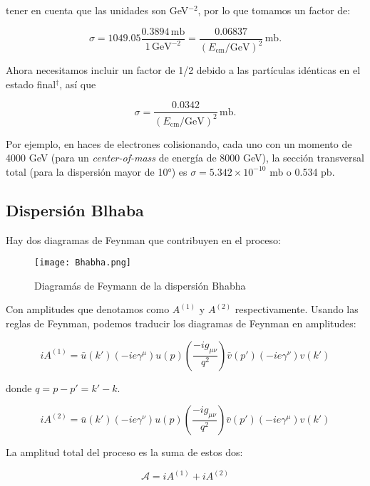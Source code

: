 tener en cuenta que las unidades son GeV$^{-2}$, por lo que tomamos un factor de:

\begin{equation}
\sigma = 1049.05 \frac{0.3894 \, \text{mb}}{1 \, \text{GeV}^{-2}} = \frac{0.06837}{(E_{\text{cm}}/\text{GeV})^2} \, \text{mb}.
\end{equation}

Ahora necesitamos incluir un factor de 1/2 debido a las partículas idénticas en el estado final$^\dagger$, así que

\begin{equation}
\sigma = \frac{0.0342}{(E_{\text{cm}}/\text{GeV})^2} \, \text{mb}.
\end{equation}

Por ejemplo, en haces de electrones colisionando, cada uno con un momento de 4000 GeV (para un \textsl{center-of-mass} de energía de 8000 GeV), la sección transversal total (para la dispersión mayor de 10°) es $\sigma = 5.342 \times 10^{-10}$ mb o 0.534 pb.


\subsection{Dispersión Blhaba}
Hay dos diagramas de Feynman que contribuyen en el proceso:
\begin{figure}
  \centering
  \texttt{[image: Bhabha.png]}
  \caption{Diagramás de Feymann de la dispersión Bhabha}
\end{figure}
Con amplitudes que denotamos como $ A^{(1)} $ y $ A^{(2)} $ respectivamente. Usando las reglas de Feynman, podemos traducir los diagramas de Feynman en amplitudes:

\begin{equation}
iA^{(1)} = \bar{u}(k')(-ie\gamma^\mu)u(p) \left( \frac{-ig_{\mu\nu}}{q^2} \right) \bar{v}(p')(-ie\gamma^\nu)v(k')
\end{equation}

donde $ q = p - p' = k' - k $.

\begin{equation}
iA^{(2)} = \bar{u}(k')(-ie\gamma^\nu)u(p) \left( \frac{-ig_{\mu\nu}}{q^2} \right) \bar{v}(p')(-ie\gamma^\mu)v(k')
\end{equation}

La amplitud total del proceso es la suma de estos dos:

\begin{equation}
\mathcal{A} = iA^{(1)} + iA^{(2)} 
\end{equation}

